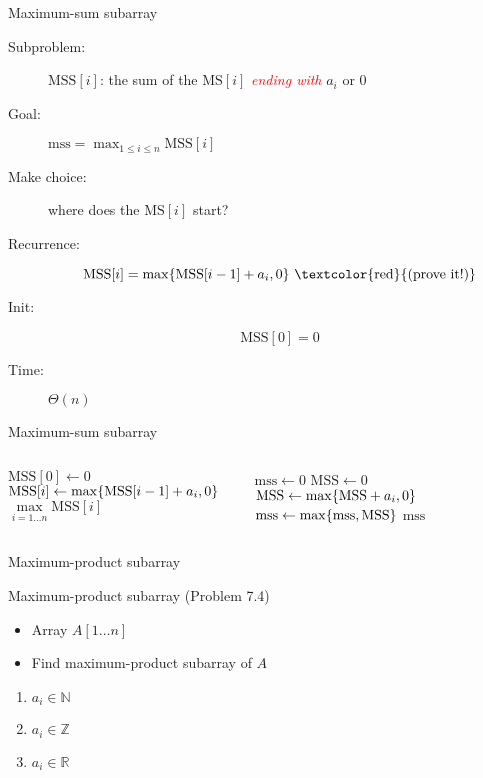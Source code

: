 \begin{frame}{Maximum-sum subarray}
  \begin{description}
	\item[Subproblem:] $\text{MSS}[i]$: the sum of the $\text{MS}[i]$ \textcolor{red}{\it ending with} $a_{i}$ or 0
	\item[Goal:] $\text{mss} = \max_{1 \le i \le n} \text{MSS}[i]$
	\pause
	\item[Make choice:] where does the $\text{MS}[i]$ start?
	\item[Recurrence:]
	  \[ 
		\text{MSS}[i] = \max \set{\text{MSS}[i-1] + a_{i}, 0} \text{ \textcolor{red}{(prove it!)}}
	  \]
	\pause
	\item[Init:]
	  \[
		\text{MSS}[0] = 0
	  \]
	  \pause
	\item[Time:] $\Theta(n)$
  \end{description}
\end{frame}
\begin{frame}{Maximum-sum subarray}
  \begin{columns}
	  \begin{algorithmic}
		\State $\text{MSS}[0] \gets 0$
		  \State $\text{MSS}[i] \gets \max\{\text{MSS}[i-1] + a_i, 0\}$
		\EndFor
		\State \Return $\max\limits_{i = 1 \dots n} \text{MSS}[i]$ 
	  \end{algorithmic}
	  \pause
	\column{0.50\textwidth}
	  \begin{algorithmic}
		\State $\text{mss} \gets 0$
		\State $\text{MSS} \gets 0$
		\ForAll{$i \gets 1 \dots n$}
		  \State $\text{MSS} \gets \max\{\text{MSS} + a_i, 0\}$
		  \State $\text{mss} \gets \max\{\text{mss}, \text{MSS}\}$
		\EndFor
		\State \Return $\text{mss}$
	  \end{algorithmic}
  \end{columns}
\end{frame}
\begin{frame}{Maximum-product subarray}
  \begin{exampleblock}{Maximum-product subarray (Problem 7.4)}
	\begin{itemize}
	  \item Array $A[1 \dots n]$
	  \item Find maximum-product subarray of $A$
	\end{itemize}

	\begin{enumerate}[(1)]
	  \item $a_i \in \mathbb{N}$
	  \item $a_i \in \mathbb{Z}$
	  \item $a_i \in \mathbb{R}$ 
	\end{enumerate}
  \end{exampleblock}

  \pause
  \vspace{0.60cm}
  \centerline{}
\end{frame}
